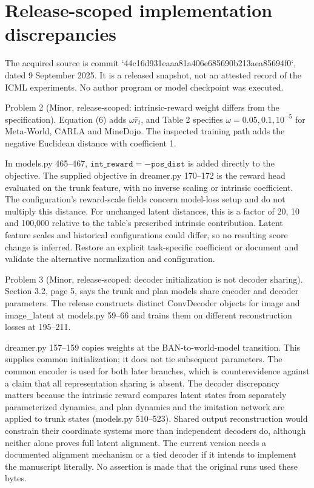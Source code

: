 \documentclass[10pt]{article}
\begin{document}
\section*{Release-scoped implementation discrepancies}
The acquired source is commit `44c16d931eaaa81a406e685690b213aea85694f0`, dated 9 September 2025. It is a released snapshot, not an attested record of the ICML experiments. No author program or model checkpoint was executed.\par
Problem 2 (Minor, release-scoped: intrinsic-reward weight differs from the specification).  Equation (6) adds \(\omega\bar r_t\), and Table 2 specifies \(\omega=0.05,0.1,10^{-5}\) for Meta-World, CARLA and MineDojo. The inspected training path adds the negative Euclidean distance with coefficient 1.\par
In models.py 465–467, \(\texttt{int\_reward}=-\texttt{pos\_dist}\) is added directly to the objective. The supplied objective in dreamer.py 170–172 is the reward head evaluated on the trunk feature, with no inverse scaling or intrinsic coefficient. The configuration’s reward-scale fields concern model-loss setup and do not multiply this distance. For unchanged latent distances, this is a factor of 20, 10 and 100,000 relative to the table’s prescribed intrinsic contribution. Latent feature scales and historical configurations could differ, so no resulting score change is inferred. Restore an explicit task-specific coefficient or document and validate the alternative normalization and configuration.\par
Problem 3 (Minor, release-scoped: decoder initialization is not decoder sharing).  Section 3.2, page 5, says the trunk and plan models share encoder and decoder parameters. The release constructs distinct ConvDecoder objects for image and image\_latent at models.py 59–66 and trains them on different reconstruction losses at 195–211.\par
dreamer.py 157–159 copies weights at the BAN-to-world-model transition. This supplies common initialization; it does not tie subsequent parameters. The common encoder is used for both later branches, which is counterevidence against a claim that all representation sharing is absent. The decoder discrepancy matters because the intrinsic reward compares latent states from separately parameterized dynamics, and plan dynamics and the imitation network are applied to trunk states (models.py 510–523). Shared output reconstruction would constrain their coordinate systems more than independent decoders do, although neither alone proves full latent alignment. The current version needs a documented alignment mechanism or a tied decoder if it intends to implement the manuscript literally. No assertion is made that the original runs used these bytes.\par
\end{document}
